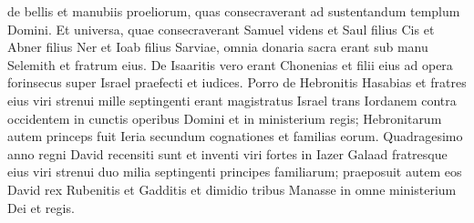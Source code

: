 \begin{biblechapter}
\verse de bellis et manubiis proeliorum, quas consecraverant ad sustentandum templum Domini. 
\verse Et universa, quae consecraverant Samuel videns et Saul filius Cis et Abner filius Ner et Ioab filius Sarviae, omnia donaria sacra erant sub manu Selemith et fratrum eius. 
\verse De Isaaritis vero erant Chonenias et filii eius ad opera forinsecus super Israel praefecti et iudices. 
\verse Porro de Hebronitis Hasabias et fratres eius viri strenui mille septingenti erant magistratus Israel trans Iordanem contra occidentem in cunctis operibus Domini et in ministerium regis; 
\verse Hebronitarum autem princeps fuit Ieria secundum cognationes et familias eorum. Quadragesimo anno regni David recensiti sunt et inventi viri fortes in Iazer Galaad 
\verse fratresque eius viri strenui duo milia septingenti principes familiarum; praeposuit autem eos David rex Rubenitis et Gadditis et dimidio tribus Manasse in omne ministerium Dei et regis. 
\end{biblechapter}

